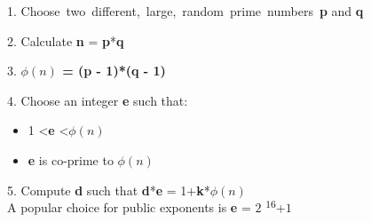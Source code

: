 \documentclass[12 pt]{article}
\begin{document}
1. Choose\ two\ different,\ large,\ random\  prime\  numbers\ \textbf{p} and \textbf{q}

2. Calculate \textbf{n} = \textbf{p}*\textbf{q}

3. \textbf{\boldmath $\phi(n)$ = (p - 1)*(q - 1)}

4. Choose an integer \textbf{e} such that:

\begin{itemize} \setlength\itemsep{1 em}
 \item  1 \textless \textbf{e} \textless \boldmath$\phi(n)$
 \item \textbf{e} is co-prime to \boldmath$\phi(n)$
\end{itemize}

5. Compute \textbf{d} such that \boldmath \textbf{d}*\textbf{e} = 1+\textbf{k}*\boldmath $\phi(n)$
\bigskip
\\
A popular choice for public exponents is \textbf{e} = $2$ \textsuperscript{$16$}+$1$
\end{document}
